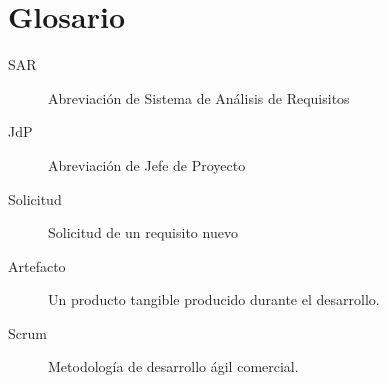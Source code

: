 \documentclass[a4paper, spanish]{article}
\begin{document}
\section{Glosario}
\begin{description}
  \item [SAR] Abreviación de Sistema de Análisis de Requisitos
  \item [JdP] Abreviación de Jefe de Proyecto
  \item [Solicitud] Solicitud de un requisito nuevo
  \item [Artefacto] Un producto tangible producido durante el desarrollo.
  \item [Scrum] Metodología de desarrollo ágil comercial. 
\end{description}
\end{document}
